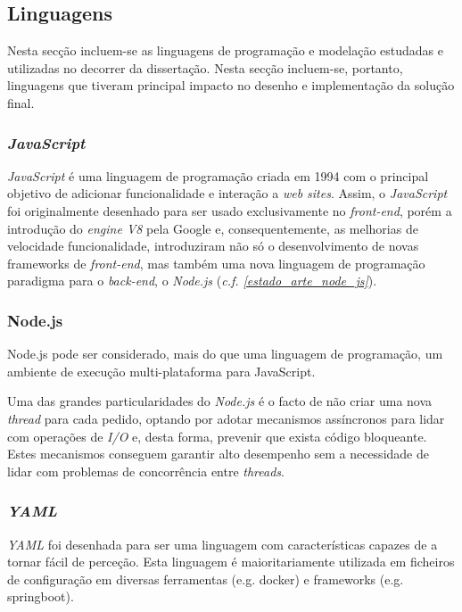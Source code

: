 \subsection{Linguagens}
Nesta secção incluem-se as linguagens de programação e modelação estudadas e utilizadas no decorrer da dissertação. Nesta secção incluem-se, portanto, linguagens que tiveram principal impacto no desenho e implementação da solução final.

\subsubsection*{\emph{JavaScript} \label{estado_arte_javascript}}

\emph{JavaScript} é uma linguagem de programação criada em 1994 com o principal objetivo de adicionar funcionalidade e interação a \emph{web sites}. Assim, o \emph{JavaScript} foi originalmente desenhado para ser usado exclusivamente no \emph{front-end}, porém a introdução do \emph{engine V8} pela Google e, consequentemente, as melhorias de velocidade funcionalidade, introduziram não só o desenvolvimento de novas frameworks de \emph{front-end}, mas também uma nova linguagem de programação paradigma para o \emph{back-end}, o \emph{Node.js} (\emph{c.f. \ref{estado_arte_node_js}})\cite{javascript}.

\subsubsection*{Node.js \label{estado_arte_node_js}}
Node.js pode ser considerado, mais do que uma linguagem de programação, um ambiente de execução multi-plataforma para JavaScript\cite{node_js}.

Uma das grandes particularidades do \emph{Node.js} é o facto de não criar uma nova \emph{thread} para cada pedido, optando por adotar mecanismos assíncronos para lidar com operações de \emph{I/O} e, desta forma, prevenir que exista código bloqueante. Estes mecanismos conseguem garantir alto desempenho sem a necessidade de lidar com problemas de concorrência entre \emph{threads}\cite{node_js}.

\subsubsection*{\emph{\acrfull{YAML}}}
\emph{\acrshort{YAML}} foi desenhada para ser uma linguagem com características capazes de a tornar fácil de perceção. Esta linguagem é maioritariamente utilizada em ficheiros de configuração em diversas ferramentas (e.g. docker) e frameworks (e.g. springboot)\cite{yaml}.

